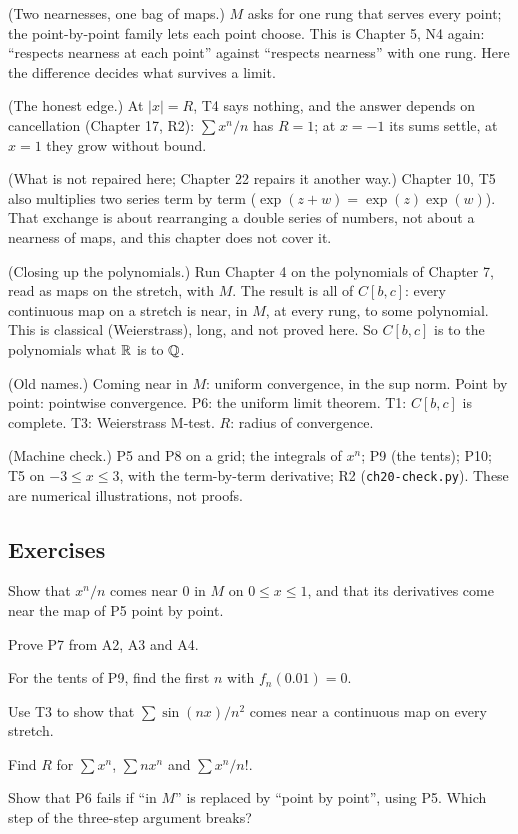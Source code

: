 \begin{lines}
\item[\lab{R1}] (Two nearnesses, one bag of maps.) $M$ asks for one rung that serves every point; the point-by-point family lets each point choose. This is Chapter 5, N4 again: ``respects nearness at each point'' against ``respects nearness'' with one rung. Here the difference decides what survives a limit.
\item[\lab{R2}] (The honest edge.) At $|x| = R$, T4 says nothing, and the answer depends on cancellation (Chapter 17, R2): $\sum x^n / n$ has $R = 1$; at $x = -1$ its sums settle, at $x = 1$ they grow without bound.
\item[\lab{R3}] (What is not repaired here; Chapter 22 repairs it another way.) Chapter 10, T5 also multiplies two series term by term ($\exp(z + w) = \exp(z) \exp(w)$). That exchange is about rearranging a double series of numbers, not about a nearness of maps, and this chapter does not cover it.
\item[\lab{R4}] (Closing up the polynomials.) Run Chapter 4 on the polynomials of Chapter 7, read as maps on the stretch, with $M$. The result is all of $C[b,c]$: every continuous map on a stretch is near, in $M$, at every rung, to some polynomial. This is classical (Weierstrass), long, and not proved here. So $C[b,c]$ is to the polynomials what $\mathbb{R}$ is to $\mathbb{Q}$.
\item[\lab{R5}] (Old names.) Coming near in $M$: uniform convergence, in the sup norm. Point by point: pointwise convergence. P6: the uniform limit theorem. T1: $C[b,c]$ is complete. T3: Weierstrass M-test. $R$: radius of convergence.
\item[\lab{R6}] (Machine check.) P5 and P8 on a grid; the integrals of $x^n$; P9 (the tents); P10; T5 on $-3 \le x \le 3$, with the term-by-term derivative; R2 (\texttt{ch20-check.py}). These are numerical illustrations, not proofs.
\end{lines}

\subsection*{Exercises}

\begin{lines}
\item[\lab{E1}] Show that $x^n / n$ comes near $0$ in $M$ on $0 \le x \le 1$, and that its derivatives come near the map of P5 point by point.
\item[\lab{E2}] Prove P7 from A2, A3 and A4.
\item[\lab{E3}] For the tents of P9, find the first $n$ with $f_n(0.01) = 0$.
\item[\lab{E4}] Use T3 to show that $\sum \sin(n x) / n^2$ comes near a continuous map on every stretch.
\item[\lab{E5}] Find $R$ for $\sum x^n$, $\sum n x^n$ and $\sum x^n / n!$.
\item[\lab{E6}] Show that P6 fails if ``in $M$'' is replaced by ``point by point'', using P5. Which step of the three-step argument breaks?
\end{lines}

